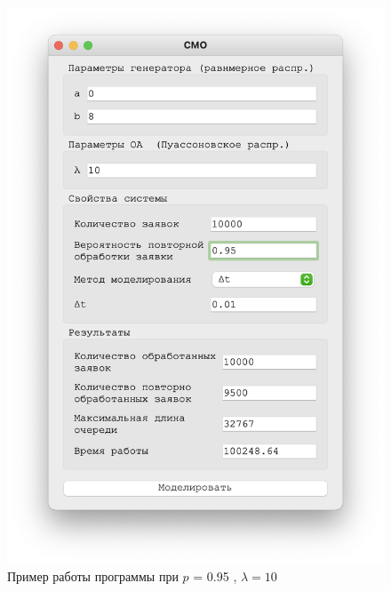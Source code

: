 \begin{figure}[!htb]
\begin{minipage}{0.55\textwidth}
      \includegraphics[width=1\linewidth]{10-95-t}
    \end{minipage}
    \caption{Пример работы программы при $p$ = 0.95 , $\lambda = 10$}
 \end{figure}


